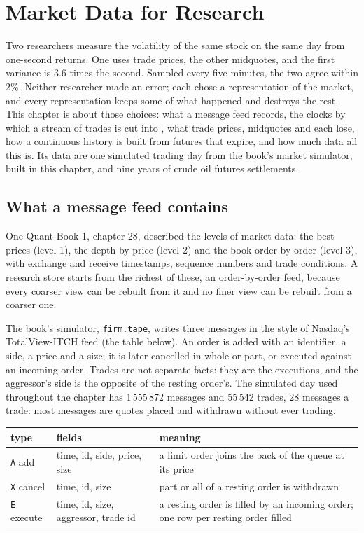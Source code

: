 \chapter{Market Data for Research}\label{ch:rs:market-data-for-research}

Two researchers measure the volatility of the same stock on the same day from one-second returns. One uses trade prices,
the other midquotes, and the first variance is 3.6 times the second. Sampled every five minutes, the two agree within 2\%.
Neither researcher made an error; each chose a representation of the market, and every representation keeps some of what
happened and destroys the rest. This chapter is about those choices: what a message feed records, the clocks by which a
stream of trades is cut into , what trade prices, midquotes and  each lose, how a continuous history is built from
futures that expire, and how much data all this is. Its data are one simulated trading day from the book's market simulator,
built in this chapter, and nine years of crude oil futures settlements.

\section{What a message feed contains}

One Quant Book 1, chapter 28, described the levels of market data: the best prices (level 1), the depth by price (level 2)
and the book order by order (level 3), with exchange and receive timestamps, sequence numbers and trade conditions. A research
store starts from the richest of these, an order-by-order feed, because every coarser view can be rebuilt from it and no finer
view can be rebuilt from a coarser one.

The book's simulator, \texttt{firm.tape}, writes three messages in the style of Nasdaq's TotalView-ITCH feed (the table
below). An order is added with an identifier, a side, a price and a size; it is later cancelled in whole or part, or executed
against an incoming order. Trades are not separate facts: they are the executions, and the aggressor's side is the opposite of
the resting order's. The simulated day used throughout the chapter has 1\,555\,872 messages and 55\,542 trades, 28 messages a
trade: most messages are quotes placed and withdrawn without ever trading.

\begin{center}
\small
\begin{tabular}{llp{7.6cm}}
\toprule
type & fields & meaning \\
\midrule
\texttt{A} add & time, id, side, price, size & a limit order joins the back of the queue at its price \\
\texttt{X} cancel & time, id, size & part or all of a resting order is withdrawn \\
\texttt{E} execute & time, id, size, aggressor, trade id & a resting order is filled by an incoming order; one row per resting order filled \\
\bottomrule
\end{tabular}
\end{center}

